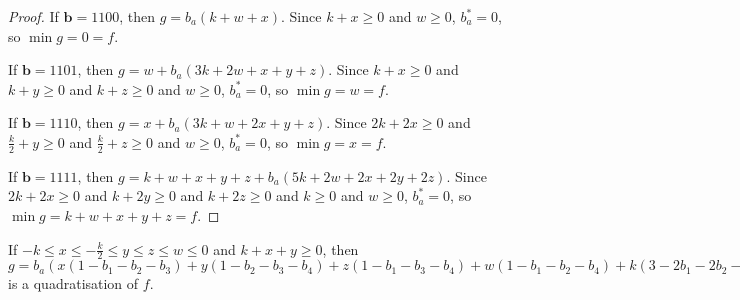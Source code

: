 \documentclass[11pt]{scrartcl}
\newcommand{\vc}[1]{\boldsymbol{#1}}
\begin{document}
\begin{proof}
If $\vc b = 1100$, then $g = b_a(k + w + x)$.
Since $k + x \ge 0$ and $w \ge 0$, $b_a^* = 0$, so $\min g = 0 = f$.

If $\vc b = 1101$, then $g = w + b_a(3k + 2w + x + y + z)$.
Since $k + x\ge 0 $ and $k + y \ge 0$ and $k + z \ge 0$ and $w \ge 0$, $b_a^* = 0$, so $\min g = w = f$.

If $\vc b = 1110$, then $g = x + b_a(3k + w + 2x + y + z)$.
Since $2k + 2x \ge 0$ and $\frac{k}{2} + y \ge 0$ and $\frac{k}{2} + z \ge 0$ and $w \ge 0$, $b_a^* = 0$, so $\min g = x = f$.

If $\vc b = 1111$, then $g = k + w + x + y + z + b_a(5k + 2w + 2x + 2y + 2z)$.
Since $2k + 2x \ge 0$ and $ k + 2y \ge 0$ and $k + 2z \ge 0$ and $k \ge 0$ and $w \ge 0$, $b_a^* = 0$, so $\min g = k + w + x + y + z = f$.

\end{proof}

\begin{lemma}
	\label{case6}
	If $-k\le x \le -\frac{k}{2} \le y \le z \le w \le 0$ and $k+x+y \ge 0$, then $g = b_a(x(1-b_1-b_2-b_3)+y(1-b_2-b_3-b_4)+z(1-b_1-b_3-b_4)+w(1-b_1-b_2-b_4)+k(3-2b_1-2b_2-2b_3-2b_4))+x(+b_1b_2+b_1b_3+b_2b_3)+y(+b_2b_3+b_2b_4+b_3b_4)+z(+b_1b_3+b_1b_4+b_3b_4)+w(+b_1b_2+b_1b_4+b_2b_4)+k(+b_1b_2+b_1b_3+b_1b_4+b_2b_3+b_2b_4+b_3b_4)$ is a quadratisation of $f$.
 \end{lemma}
\end{document}
